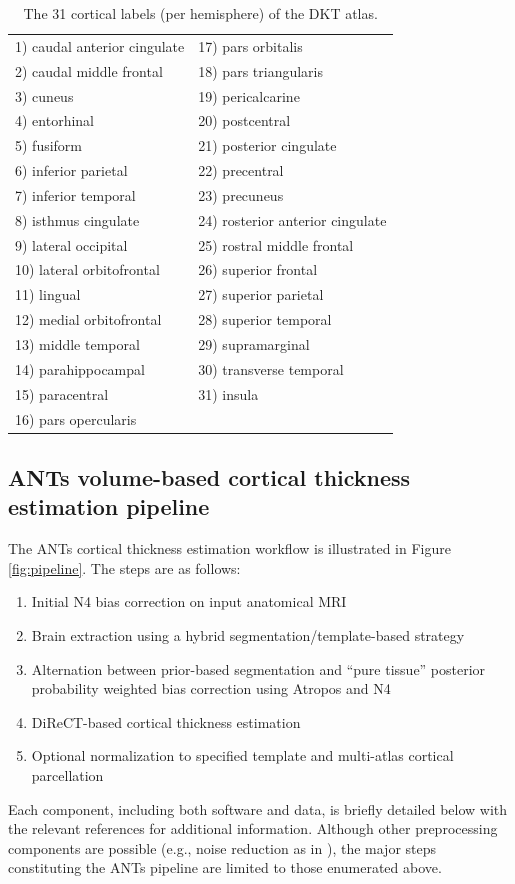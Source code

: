 \begin{table}
\centering
\caption{The 31 cortical labels (per hemisphere) of the DKT atlas.  }
\begin{tabular*}{0.475\textwidth}{@{\extracolsep{\fill}} l l}
\toprule
  1) caudal anterior cingulate & 17) pars orbitalis \\
  2) caudal middle frontal & 18) pars triangularis \\
  3) cuneus &  19) pericalcarine \\
  4) entorhinal & 20) postcentral \\
  5) fusiform &  21) posterior cingulate\\
  6) inferior parietal & 22) precentral \\
  7) inferior temporal & 23) precuneus \\
  8) isthmus cingulate & 24) rosterior anterior cingulate\\
  9) lateral occipital & 25) rostral middle frontal \\
  10) lateral orbitofrontal  & 26) superior frontal \\
  11) lingual & 27) superior parietal \\
  12) medial orbitofrontal & 28) superior temporal \\
  13) middle temporal & 29) supramarginal \\
  14) parahippocampal & 30) transverse temporal \\
  15) paracentral & 31) insula \\
  16) pars opercularis  & {}\\
  \bottomrule
\end{tabular*}
\label{table:dkt_labels}
\end{table}

\subsection{ANTs volume-based cortical thickness estimation pipeline}

The ANTs cortical thickness estimation workflow is illustrated
in Figure \ref{fig:pipeline}.  The steps are as follows:
\begin{enumerate}
  \item Initial N4 bias correction on input anatomical MRI
  \item Brain extraction using a hybrid segmentation/template-based strategy
  \item Alternation between prior-based segmentation and ``pure tissue''
        posterior probability weighted bias correction using Atropos and N4
  \item DiReCT-based cortical thickness estimation
  \item Optional normalization to specified template and multi-atlas
    cortical parcellation
\end{enumerate}
Each component, including both software and data, is briefly detailed 
below with the relevant references for additional information. 
{\color{blue}Although other preprocessing components are possible (e.g., noise reduction
as in \cite{smith1996}), the major steps constituting the ANTs pipeline 
are limited to those enumerated above.}

